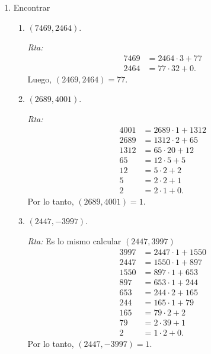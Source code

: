 \documentclass[a4paper,12pt,twoside,spanish,reqno]{amsbook}
\numberwithin{equation}{section}
\newcommand{\rta}{\noindent\textit{Rta: }}
\begin{document}
\begin{enumerate}
\item Encontrar
\begin{enumerate}

      \item $(7469,2464)$.
      
      \rta 
      \begin{align*}
        7469 &= 2464 \cdot 3 + 77 \\
        2464 &= 77 \cdot 32 +0.
    \end{align*}
    Luego, $(2469,2464)=77$.

      \item  $(2689,4001)$.
      
      \rta
      \begin{align*}
        4001 &= 2689 \cdot 1  + 1312 \\
        2689 &= 1312 \cdot 2 + 65 \\
        1312 &= 65 \cdot 20 + 12 \\
        65 &= 12 \cdot 5 + 5 \\
        12 &= 5 \cdot 2 + 2 \\
        5 &= 2 \cdot 2 + 1 \\
        2 &= 2 \cdot 1 + 0.
    \end{align*}
    Por lo tanto, $ (2689, 4001)=1$.

      \item  $(2447,-3997)$.
      
      \rta Es lo mismo calcular  $(2447,3997)$
      \begin{align*}
        3997 &= 2447 \cdot 1  + 1550 \\
        2447 &= 1550 \cdot 1 + 897 \\
        1550 &= 897 \cdot 1 + 653 \\
        897 &= 653 \cdot 1 + 244 \\
        653 &= 244 \cdot 2 + 165 \\
        244 &= 165 \cdot 1 + 79 \\
        165 &= 79 \cdot 2 + 2 \\
        79 &= 2 \cdot 39 + 1 \\
        2 &= 1 \cdot 2 + 0.
    \end{align*}
    Por lo tanto, $(2447,-3997)=1$.


\end{enumerate}
\end{enumerate}
\end{document}
